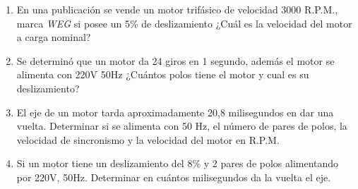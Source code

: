 \documentclass[../mainnull]{subfiles}
\begin{document}
\begin{enumerate}
    \begin{itemize}
      \item 1HP
      \item 1425 R.P.M
      \item 50Hz
      \item 5.7A
      \item 220V
      \item Cap 430/514$\mu$
      \item $\cos(\varphi)=0,9$
      \item IP21 uso general.
    \end{itemize}
    ¿Cuántos pares de polos tiene y cual es su rendimiento?
  \item En una publicación se vende un motor trifásico de velocidad
    3000 R.P.M., marca \emph{WEG} si posee un 5\% de deslizamiento
    ¿Cuál es la velocidad del motor a carga nominal?
  \item Se determinó que un motor da 24 giros en 1 segundo, además el
    motor se alimenta con 220V 50Hz ¿Cuántos polos tiene el motor y
    cual es su deslizamiento?
  \item El eje de un motor tarda aproximadamente 20,8 milisegundos en
    dar una vuelta. Determinar si se alimenta con 50 Hz, el número de
    pares de polos, la velocidad de sincronismo y la velocidad del
    motor en R.P.M.
  \item Si un motor tiene un deslizamiento del 8\% y 2 pares de polos
    alimentando por 220V, 50Hz. Determinar en cuántos milisegundos
    da la vuelta el eje.
\end{enumerate}
\end{document}
